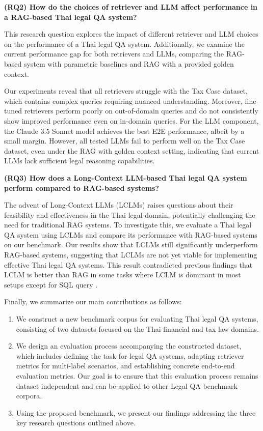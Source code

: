 \textbf{(RQ2) How do the choices of retriever and LLM affect performance in a RAG-based Thai legal QA system?}  

This research question explores the impact of different retriever and LLM choices on the performance of a Thai legal QA system. 
%
Additionally, we examine the current performance gap for both retrievers and LLMs, comparing the RAG-based system with parametric baselines and RAG with a provided golden context.  

Our experiments reveal that all retrievers struggle with the Tax Case dataset, which contains complex queries requiring nuanced understanding. 
%
Moreover, fine-tuned retrievers perform poorly on out-of-domain queries and do not consistently show improved performance even on in-domain queries. 
%
For the LLM component, the Claude 3.5 Sonnet model \cite{claude3.5sonnet} achieves the best E2E performance, albeit by a small margin. 
%
However, all tested LLMs fail to perform well on the Tax Case dataset, even under the RAG with golden context setting, indicating that current LLMs lack sufficient legal reasoning capabilities.  

\textbf{(RQ3) How does a Long-Context LLM-based Thai legal QA system perform compared to RAG-based systems?}  

The advent of Long-Context LLMs (LCLMs) raises questions about their feasibility and effectiveness in the Thai legal domain, potentially challenging the need for traditional RAG systems. 
%
To investigate this, we evaluate a Thai legal QA system using LCLMs and compare its performance with RAG-based systems on our benchmark. 
%
Our results show that LCLMs still significantly underperform RAG-based systems, suggesting that LCLMs are not yet viable for implementing effective Thai legal QA systems.
%
This result contradicted previous findings that LCLM is better than RAG in some tasks \cite{laban2024summaryhaystackchallengelongcontext,selfroute,lee2024longcontextlanguagemodelssubsume} where LCLM is dominant in most setups except for SQL query \cite{lee2024longcontextlanguagemodelssubsume}.

Finally, we summarize our main contributions as follows:
\begin{enumerate}
    \item {We construct a new benchmark corpus for evaluating Thai legal QA systems, consisting of two datasets focused on the Thai financial and tax law domains.}
    
    \item {We design an evaluation process accompanying the constructed dataset, which includes defining the task for legal QA systems, adapting retriever metrics for multi-label scenarios, and establishing concrete end-to-end evaluation metrics. 
    Our goal is to ensure that this evaluation process remains dataset-independent and can be applied to other Legal QA benchmark corpora.}
    
    \item {Using the proposed benchmark, we present our findings addressing the three key research questions outlined above.}
\end{enumerate}


